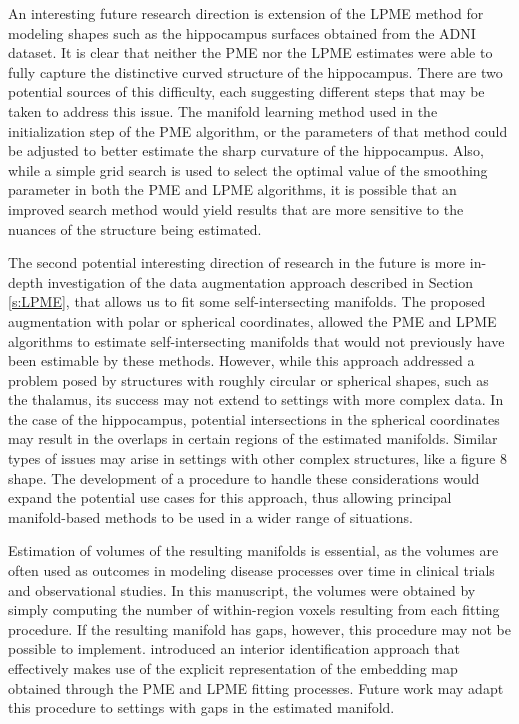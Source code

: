 \documentclass[12pt]{article}
\theoremstyle{definition}
\begin{document}
An interesting future research direction is extension of the LPME method for modeling  shapes such as the hippocampus surfaces obtained from the ADNI dataset. It is clear that neither the PME nor the LPME estimates were able to fully capture the distinctive curved structure of the hippocampus. There are two potential sources of this difficulty, each suggesting different steps that may be taken to address this issue. The manifold learning method used in the initialization step of the PME algorithm, or the parameters of that method could be adjusted to better estimate the sharp curvature of the hippocampus. Also, while a simple grid search is used to select the optimal value of the smoothing parameter in both the PME and LPME algorithms, it is possible that an improved search method would yield results that are more sensitive to the nuances of the structure being estimated. 

The second potential interesting direction of research in the future is more in-depth investigation of the data augmentation approach  described in Section \ref{s:LPME}, that allows us to fit some self-intersecting manifolds. The proposed augmentation with polar or spherical coordinates, allowed the PME and LPME algorithms to estimate self-intersecting manifolds that would not previously have been estimable by these methods. However, while this approach addressed a problem posed by structures with roughly circular or spherical shapes, such as the thalamus, its success may not extend to settings with more complex data. In the case of the hippocampus, potential intersections in the spherical coordinates may result in the overlaps in certain regions of the estimated manifolds. Similar types of issues may arise in settings with other complex structures, like a figure 8 shape. The development of a procedure to handle these considerations would expand the potential use cases for this approach, thus allowing principal manifold-based methods to be used in a wider range of situations.

Estimation of volumes of the resulting manifolds is essential, as the volumes are often used as outcomes in modeling disease processes over time in clinical trials and observational studies. In this manuscript, the volumes were obtained by simply computing the number of within-region voxels resulting from each fitting procedure. If the resulting manifold has gaps, however, this procedure may not be possible to implement. \cite{mengPrincipalManifoldEstimation2021} introduced an interior identification approach that effectively makes use of the explicit representation of the embedding map obtained through the PME and LPME fitting processes. Future work may adapt this procedure to settings with gaps in the estimated manifold.
\end{document}
